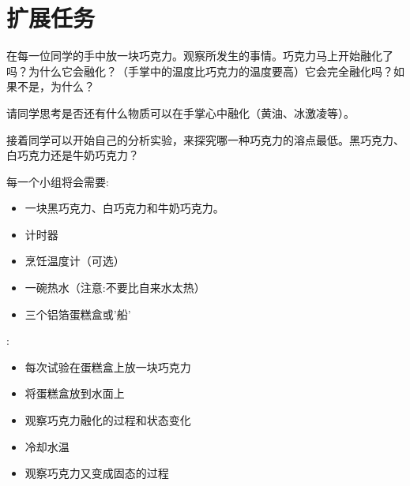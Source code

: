 \section{扩展任务}
     在每一位同学的手中放一块巧克力。观察所发生的事情。巧克力马上开始融化了吗？为什么它会融化？（手掌中的温度比巧克力的温度要高）它会完全融化吗？如果不是，为什么？\par
     请同学思考是否还有什么物质可以在手掌心中融化（黄油、冰激凌等）。\par
     接着同学可以开始自己的分析实验，来探究哪一种巧克力的溶点最低。黑巧克力、白巧克力还是牛奶巧克力？\par
     每一个小组将会需要:\par
     \begin{itemize}
        \item 一块黑巧克力、白巧克力和牛奶巧克力。
        \item 计时器
        \item 烹饪温度计（可选） 
        \item 一碗热水（注意:不要比自来水太热）
        \item 三个铝箔蛋糕盒或'船'            
     \end{itemize}  
     :\par
     \begin{itemize}
       \item 每次试验在蛋糕盒上放一块巧克力
       \item 将蛋糕盒放到水面上
       \item 观察巧克力融化的过程和状态变化
       \item 冷却水温
       \item 观察巧克力又变成固态的过程
     \end{itemize}
     
